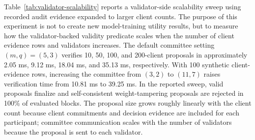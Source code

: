 \documentclass[preprint,12pt]{elsarticle}
\begin{document}
Table~\ref{tab:validator-scalability} reports a validator-side scalability sweep using recorded audit evidence expanded to larger client counts. The purpose of this experiment is not to create new model-training utility results, but to measure how the validator-backed validity predicate scales when the number of client evidence rows and validators increases. The default committee setting $(m,q)=(5,3)$ verifies 10, 50, 100, and 200-client proposals in approximately 2.05 ms, 9.12 ms, 18.04 ms, and 35.13 ms, respectively. With 100 synthetic client-evidence rows, increasing the committee from $(3,2)$ to $(11,7)$ raises verification time from 10.81 ms to 39.25 ms. In the reported sweep, valid proposals finalize and self-consistent weight-tampering proposals are rejected in 100\% of evaluated blocks. The proposal size grows roughly linearly with the client count because client commitments and decision evidence are included for each participant; committee communication scales with the number of validators because the proposal is sent to each validator.

\begin{table}[t]
\centering
\caption{Validator-side scalability of audit verification. Client counts are obtained by deterministic expansion of recorded audit evidence; rejection is measured against self-consistent weight tampering.}
\label{tab:validator-scalability}
\end{table}
\end{document}
